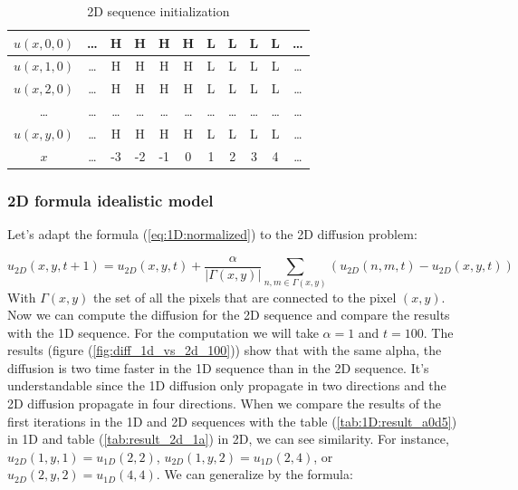 \begin{table}[htb]
    \centering
    \begin{tabular}{|c|c|c|c|c|c||c|c|c|c|c|} \hline
        $u(x,0,0)$&\ldots&   H  &   H  &   H  &   H  &   L  &   L  &   L  &   L  &\ldots\\\hline
        $u(x,1,0)$&\ldots&   H  &   H  &   H  &   H  &   L  &   L  &   L  &   L  &\ldots\\\hline 
        $u(x,2,0)$&\ldots&   H  &   H  &   H  &   H  &   L  &   L  &   L  &   L  &\ldots\\\hline 
        \ldots    &\ldots&\ldots&\ldots&\ldots&\ldots&\ldots&\ldots&\ldots&\ldots&\ldots\\\hline 
        $u(x,y,0)$&\ldots&   H  &   H  &   H  &   H  &   L  &   L  &   L  &   L  & \ldots \\ \hline \hline
        $x$       &\ldots&  -3  &  -2  &  -1  &   0  &   1  &   2  &   3  &   4  & \ldots \\ \hline
    \end{tabular}
    \caption{2D sequence initialization}
    \label{tab:2D_init}
\end{table}

\subsubsection{2D formula idealistic model}

Let's adapt the formula (\ref{eq:1D:normalized}) to the 2D diffusion problem:

\begin{equation}
    u_{2D}(x,y,t+1) = u_{2D}(x,y,t) + \frac{\alpha}{|\Gamma(x,y)|} \sum_{n,m \in \Gamma(x,y)} \left(u_{2D}(n,m,t) - u_{2D}(x,y,t)\right)
    \label{eq:2Dnorm}
\end{equation}
%
With $\Gamma(x,y)$ the set of all the pixels that are connected to the pixel $(x,y)$. \\
%
Now we can compute the diffusion for the 2D sequence and compare the results with the 
1D sequence. For the computation we will take $\alpha = 1$ and $t = 100$. The results
(figure (\ref{fig:diff_1d_vs_2d_100})) show that with the same alpha, the diffusion
is two time faster in the 1D sequence than in the 2D sequence. It's understandable since
the 1D diffusion only propagate in two directions and the 2D diffusion propagate in four
directions. When we compare the results of the first iterations in the 1D and 2D sequences
with the table (\ref{tab:1D:result_a0d5}) in 1D and table (\ref{tab:result_2d_1a}) in 2D,
we can see similarity. For instance, $u_{2D}(1,y,1)=u_{1D}(2,2)$, $u_{2D}(1,y,2)=u_{1D}(2,4)$,
or $u_{2D}(2,y,2)=u_{1D}(4,4)$. We can generalize by the formula:

